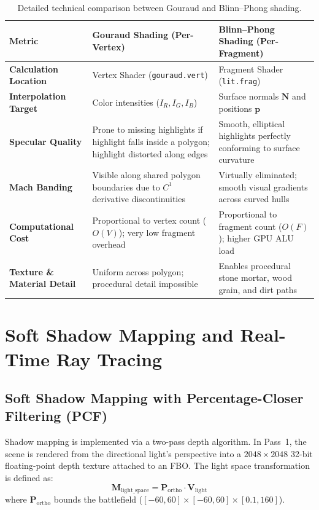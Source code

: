 \documentclass[11pt,a4paper]{article}
\begin{document}
\begin{table}[H]
\centering\small
\begin{tabular}{@{}p{38mm}p{56mm}p{56mm}@{}}
\toprule
\textbf{Metric} & \textbf{Gouraud Shading (Per-Vertex)} & \textbf{Blinn--Phong Shading (Per-Fragment)} \\
\midrule
\textbf{Calculation Location} & Vertex Shader (\texttt{gouraud.vert}) & Fragment Shader (\texttt{lit.frag}) \\
\textbf{Interpolation Target} & Color intensities ($I_R, I_G, I_B$) & Surface normals $\mathbf{N}$ and positions $\mathbf{p}$ \\
\textbf{Specular Quality} & Prone to missing highlights if highlight falls inside a polygon; highlight distorted along edges & Smooth, elliptical highlights perfectly conforming to surface curvature \\
\textbf{Mach Banding} & Visible along shared polygon boundaries due to $C^1$ derivative discontinuities & Virtually eliminated; smooth visual gradients across curved hulls \\
\textbf{Computational Cost} & Proportional to vertex count ($O(V)$); very low fragment overhead & Proportional to fragment count ($O(F)$); higher GPU ALU load \\
\textbf{Texture \& Material Detail} & Uniform across polygon; procedural detail impossible & Enables procedural stone mortar, wood grain, and dirt paths \\
\bottomrule
\end{tabular}
\caption{Detailed technical comparison between Gouraud and Blinn--Phong shading.}
\label{tab:gouraud_vs_phong}
\end{table}

\section{Soft Shadow Mapping and Real-Time Ray Tracing}

\subsection{Soft Shadow Mapping with Percentage-Closer Filtering (PCF)}
Shadow mapping is implemented via a two-pass depth algorithm. In Pass~1, the scene is rendered from the directional light's perspective into a $2048 \times 2048$ 32-bit floating-point depth texture attached to an FBO. The light space transformation is defined as:
\begin{equation}
  \mathbf{M}_{\text{light\_space}} = \mathbf{P}_{\text{ortho}} \cdot \mathbf{V}_{\text{light}}
\end{equation}
where $\mathbf{P}_{\text{ortho}}$ bounds the battlefield ($[-60, 60] \times [-60, 60] \times [0.1, 160]$).
\end{document}
